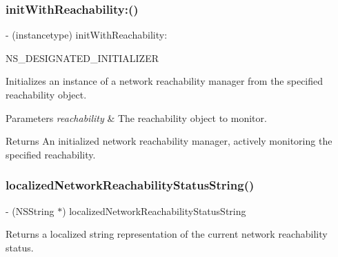 \subsubsection{\texorpdfstring{init\+With\+Reachability\+:()}{initWithReachability:()}\hspace{0.1cm}{\footnotesize\ttfamily [3/3]}}
{\footnotesize\ttfamily -\/ (instancetype) init\+With\+Reachability\+: \begin{DoxyParamCaption}\item[{(S\+C\+Network\+Reachability\+Ref)}]{N\+S\+\_\+\+D\+E\+S\+I\+G\+N\+A\+T\+E\+D\+\_\+\+I\+N\+I\+T\+I\+A\+L\+I\+Z\+ER }\end{DoxyParamCaption}}

Initializes an instance of a network reachability manager from the specified reachability object.


\begin{DoxyParams}{Parameters}
{\em reachability} & The reachability object to monitor.\\
\hline
\end{DoxyParams}
\begin{DoxyReturn}{Returns}
An initialized network reachability manager, actively monitoring the specified reachability. 
\end{DoxyReturn}
\mbox{\label{interface_a_f_network_reachability_manager_afe6a32b5ab75661a802e6bbefaa74e2d}} 
\subsubsection{\texorpdfstring{localized\+Network\+Reachability\+Status\+String()}{localizedNetworkReachabilityStatusString()}\hspace{0.1cm}{\footnotesize\ttfamily [1/3]}}
{\footnotesize\ttfamily -\/ (N\+S\+String $\ast$) localized\+Network\+Reachability\+Status\+String \begin{DoxyParamCaption}{ }\end{DoxyParamCaption}}

Returns a localized string representation of the current network reachability status. \mbox{\label{interface_a_f_network_reachability_manager_afe6a32b5ab75661a802e6bbefaa74e2d}} 
